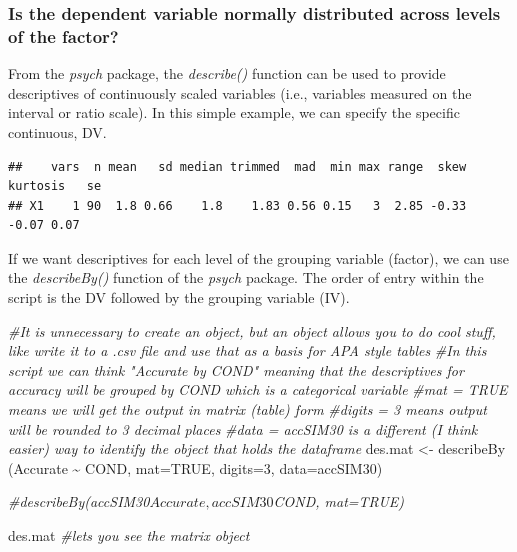 \documentclass[
  english,
]{book}
\newenvironment{Shaded}{\begin{snugshade}}{\end{snugshade}}
\newcommand{\AttributeTok}[1]{\textcolor[rgb]{0.77,0.63,0.00}{#1}}
\newcommand{\CommentTok}[1]{\textcolor[rgb]{0.56,0.35,0.01}{\textit{#1}}}
\newcommand{\ConstantTok}[1]{\textcolor[rgb]{0.00,0.00,0.00}{#1}}
\newcommand{\DecValTok}[1]{\textcolor[rgb]{0.00,0.00,0.81}{#1}}
\newcommand{\FunctionTok}[1]{\textcolor[rgb]{0.00,0.00,0.00}{#1}}
\newcommand{\NormalTok}[1]{#1}
\newcommand{\OtherTok}[1]{\textcolor[rgb]{0.56,0.35,0.01}{#1}}
\newcommand{\SpecialCharTok}[1]{\textcolor[rgb]{0.00,0.00,0.00}{#1}}
\begin{document}
\hypertarget{is-the-dependent-variable-normally-distributed-across-levels-of-the-factor}{%
\subsubsection{Is the dependent variable normally distributed across levels of the factor?}\label{is-the-dependent-variable-normally-distributed-across-levels-of-the-factor}}

From the \emph{psych} package, the \emph{describe()} function can be used to provide descriptives of continuously scaled variables (i.e., variables measured on the interval or ratio scale). In this simple example, we can specify the specific continuous, DV.

\begin{Shaded}
\end{Shaded}

\begin{verbatim}
##    vars  n mean   sd median trimmed  mad  min max range  skew kurtosis   se
## X1    1 90  1.8 0.66    1.8    1.83 0.56 0.15   3  2.85 -0.33    -0.07 0.07
\end{verbatim}

If we want descriptives for each level of the grouping variable (factor), we can use the \emph{describeBy()} function of the \emph{psych} package. The order of entry within the script is the DV followed by the grouping variable (IV).

\begin{Shaded}
\begin{Highlighting}[]
\CommentTok{\#It is unnecessary to create an object, but an object allows you to do cool stuff, like write it to a .csv file and use that as a basis for APA style tables}
\CommentTok{\#In this script we can think "Accurate by COND" meaning that the descriptives for accuracy will be grouped by COND which is a categorical variable}
\CommentTok{\#mat = TRUE means we will get the output in matrix (table) form}
\CommentTok{\#digits = 3 means output will be rounded to 3 decimal places}
\CommentTok{\#data = accSIM30 is a different (I think easier) way to identify the object that holds the dataframe}
\NormalTok{des.mat }\OtherTok{\textless{}{-}} \FunctionTok{describeBy}\NormalTok{ (Accurate }\SpecialCharTok{\textasciitilde{}}\NormalTok{ COND, }\AttributeTok{mat=}\ConstantTok{TRUE}\NormalTok{, }\AttributeTok{digits=}\DecValTok{3}\NormalTok{, }\AttributeTok{data=}\NormalTok{accSIM30) }

\CommentTok{\#describeBy(accSIM30$Accurate, accSIM30$COND, mat=TRUE)}

\NormalTok{des.mat }\CommentTok{\#let\textquotesingle{}s you see the matrix object}
\end{Highlighting}
\end{Shaded}
\end{document}
